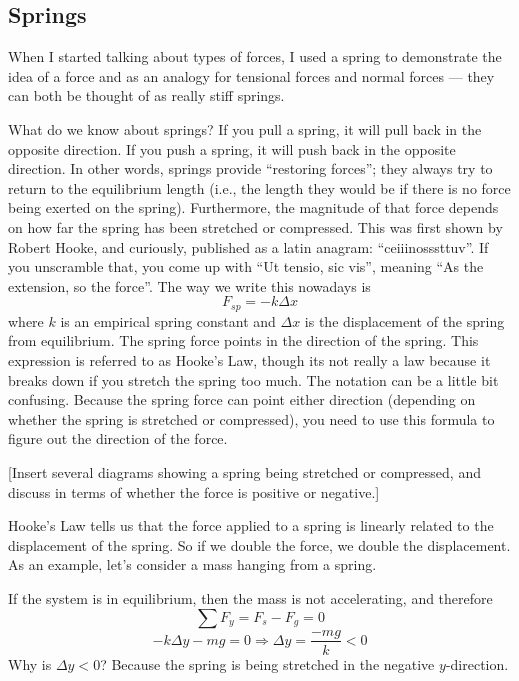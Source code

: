 
\subsection{Springs}
When I started talking about types of forces, I used a spring to demonstrate the idea of a force and as an analogy for tensional forces and normal forces --- they can both be thought of as really stiff springs.

What do we know about springs? If you pull a spring, it will pull back in the opposite direction. If you push a spring, it will push back in the opposite direction. In other words, springs provide ``restoring forces''; they always try to return to the equilibrium length (i.e., the length they would be if there is no force being exerted on the spring). Furthermore, the magnitude of that force depends on how far the spring has been stretched or compressed. This was first shown by Robert Hooke, and curiously, published as a latin anagram: ``ceiiinosssttuv''. If you unscramble that, you come up with ``Ut tensio, sic vis'', meaning ``As the extension, so the force''. The way we write this nowadays is
$$\boxed{F_{sp}=-k\Delta{x}}$$
where $k$ is an empirical spring constant and $\Delta{x}$ is the displacement of the spring from equilibrium. The spring force points in the direction of the spring. This expression is referred to as Hooke's Law, though its not really a law because it breaks down if you stretch the spring too much. The notation can be a little bit confusing. Because the spring force can point either direction (depending on whether the spring is stretched or compressed), you need to use this formula to figure out the direction of the force.

[Insert several diagrams showing a spring being stretched or compressed, and discuss in terms of whether the force is positive or negative.]
\vspace{8cm}

Hooke's Law tells us that the force applied to a spring is linearly related to the displacement of the spring. So if we double the force, we double the displacement. As an example, let's consider a mass hanging from a spring.

\vspace{5cm}

If the system is in equilibrium, then the mass is not accelerating, and therefore
$$\sum F_y = F_s-F_g=0$$
$$-k\Delta{y}-mg=0\Rightarrow \Delta{y}=\frac{-mg}{k}<0$$
Why is $\Delta{y}<0$? Because the spring is being stretched in the negative $y$-direction.


